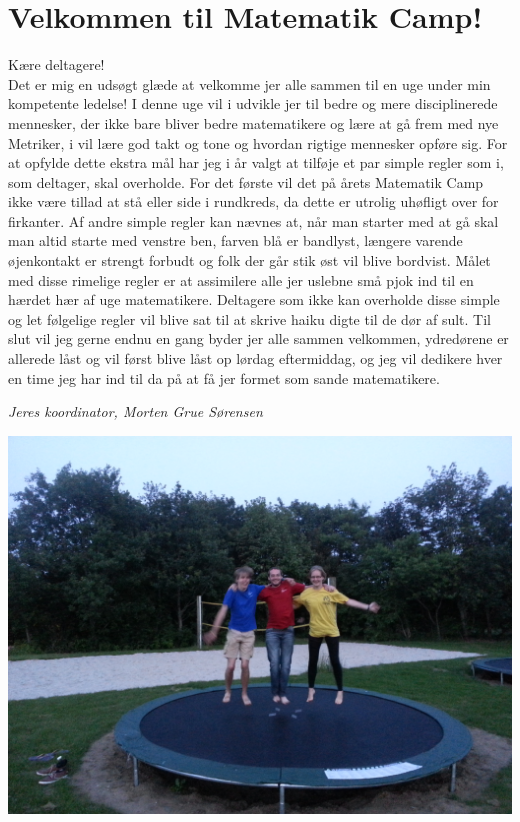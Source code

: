 \begin{minipage}[b]{0.95\linewidth}
\begin{minipage}[t]{0.47\textwidth}
\section*{Velkommen til Matematik Camp!}
Kære deltagere!\\
Det er mig en udsøgt glæde at velkomme jer alle sammen til en uge under min kompetente ledelse! I denne uge vil i udvikle jer til bedre og mere disciplinerede mennesker, der ikke bare bliver bedre matematikere og lære at gå frem med nye Metriker, i vil lære god takt og tone og hvordan rigtige mennesker opføre sig. For at opfylde dette ekstra mål har jeg i år valgt at tilføje et par simple regler som i, som deltager, skal overholde. For det første vil det på årets Matematik Camp ikke være tillad at stå eller side i rundkreds, da dette er utrolig uhøfligt over for firkanter. Af andre simple regler kan nævnes at, når man starter med at gå skal man altid starte med venstre ben, farven blå er bandlyst, længere varende øjenkontakt er strengt forbudt og folk der går stik øst vil blive bordvist. Målet med disse rimelige regler er at assimilere alle jer uslebne små pjok ind til en hærdet hær af uge matematikere. Deltagere som ikke kan overholde disse simple og let følgelige regler vil blive sat til at skrive haiku digte til de dør af sult. Til slut vil jeg gerne endnu en gang byder jer alle sammen velkommen, ydredørene er allerede låst og vil først blive låst op lørdag eftermiddag, og jeg vil dedikere hver en time jeg har ind til da på at få jer formet som sande matematikere.

 
{\flushright\emph{Jeres koordinator, Morten Grue Sørensen}}

\begin{center}
\includegraphics[width=\linewidth]{koordinatorer.jpg}
\end{center}

\end{minipage}
\end{minipage}
